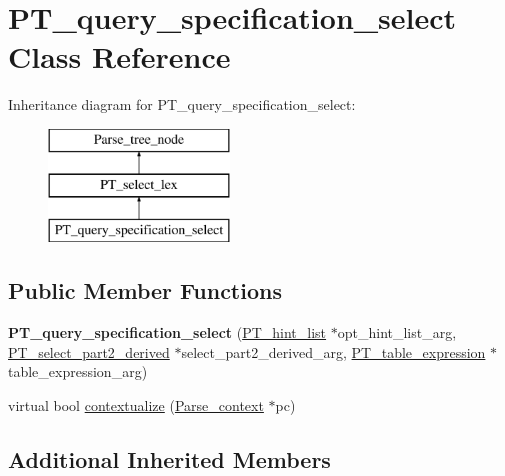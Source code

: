 \hypertarget{classPT__query__specification__select}{}\section{P\+T\+\_\+query\+\_\+specification\+\_\+select Class Reference}
\label{classPT__query__specification__select}
Inheritance diagram for P\+T\+\_\+query\+\_\+specification\+\_\+select\+:\begin{figure}[H]
\begin{center}
\leavevmode
\includegraphics[height=3.000000cm]{classPT__query__specification__select}
\end{center}
\end{figure}
\subsection*{Public Member Functions}
\begin{DoxyCompactItemize}
\item 
\mbox{\label{classPT__query__specification__select_aeda967b2a125442b8e48b59c70084165}} 
{\bfseries P\+T\+\_\+query\+\_\+specification\+\_\+select} (\mbox{\hyperlink{classPT__hint__list}{P\+T\+\_\+hint\+\_\+list}} $\ast$opt\+\_\+hint\+\_\+list\+\_\+arg, \mbox{\hyperlink{classPT__select__part2__derived}{P\+T\+\_\+select\+\_\+part2\+\_\+derived}} $\ast$select\+\_\+part2\+\_\+derived\+\_\+arg, \mbox{\hyperlink{classPT__table__expression}{P\+T\+\_\+table\+\_\+expression}} $\ast$table\+\_\+expression\+\_\+arg)
\item 
virtual bool \mbox{\hyperlink{classPT__query__specification__select_a916a44606b98ed38e2112625a991f89b}{contextualize}} (\mbox{\hyperlink{structParse__context}{Parse\+\_\+context}} $\ast$pc)
\end{DoxyCompactItemize}
\subsection*{Additional Inherited Members}


